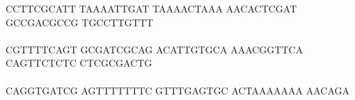 \documentclass[11pt,twoside,reqno,a4paper]{article}
\begin{document}
{CCTTCGCATT	TAAAATTGAT	TAAAACTAAA	AACACTCGAT	GCCGACGCCG	TGCCTTGTTT	\\
\hspace*{1\charwidth}\hspace*{1\charwidth}\hspace*{1\charwidth}\hspace*{1\charwidth}\hspace*{1\charwidth}\hspace*{1\charwidth}\\
CGTTTTCAGT	GCGATCGCAG	ACATTGTGCA	AAACGGTTCA	CAGTTCTCTC	CTCGCGACTG	\\
\hspace*{1\charwidth}\hspace*{1\charwidth}\hspace*{1\charwidth}\hspace*{1\charwidth}\hspace*{1\charwidth}\hspace*{1\charwidth}\\
CAGGTGATCG	AGTTTTTTTC	GTTTGAGTGC	ACTAAAAAAA	AACAGA\\
\hspace*{1\charwidth}\hspace*{1\charwidth}\hspace*{1\charwidth}\hspace*{1\charwidth}\\
\\
\\
\\
\\
\\
\\
\\
\\
\\
\\
\\
\\
\\
\\
\\
\\
\\
\\
\\
\\
\\
\\
\\
\\
\\
\\
\\
\\
\\
\\
\\
\\
\\
\\
\\
\\
\\
\\
}
\end{document}
